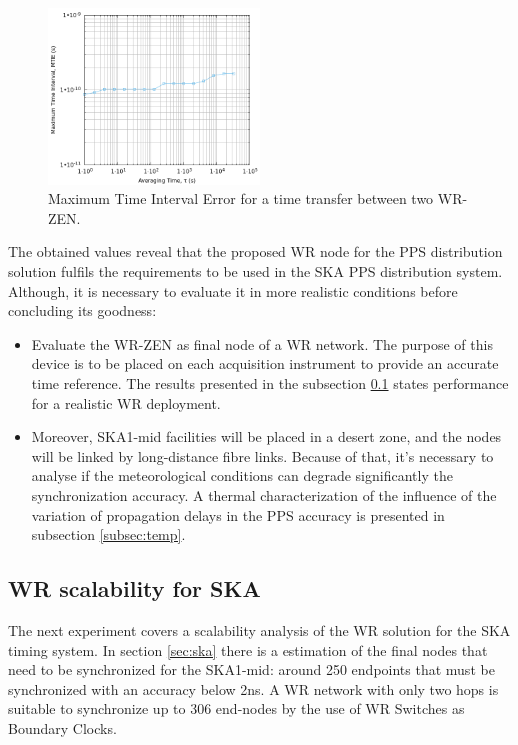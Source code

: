 \begin{figure}
		\centering
		\includegraphics[width=0.5\textwidth]{img/MTIE_exp1}
		\caption[MTIE plot for the WR-ZEN]{Maximum Time Interval Error for a 
		time transfer between two WR-ZEN.}
		\label{fig:mtie_exp1}

\end{figure}

The obtained values reveal that the proposed WR node for the PPS distribution 
solution fulfils the requirements to be used in the SKA PPS distribution 
system. Although, it is necessary to evaluate it in more realistic conditions 
before concluding its goodness:

\begin{itemize}
	\item Evaluate the WR-ZEN as final node of a WR network. The purpose of 
	this device is to be placed on each acquisition instrument to provide an 
	accurate time reference. The results presented in the subsection 
	\ref{subsec: net_exp} states performance for a realistic WR deployment.
	
	\item Moreover, SKA1-mid facilities will be placed in a desert zone, and 
	the nodes will be linked by long-distance fibre links. Because of that, 
	it's 
	necessary to analyse if the meteorological conditions can degrade 
	significantly the synchronization accuracy. A thermal characterization of 
	the influence of the variation of propagation delays in the PPS accuracy is 
	presented in subsection \ref{subsec:temp}.
\end{itemize}   

\subsection{WR scalability for SKA} %
\label{subsec: net_exp}

The next experiment covers a scalability analysis of the WR solution for the 
SKA timing system. In section \ref{sec:ska} there is a estimation of the final 
nodes that need to be synchronized for the SKA1-mid: around 250 endpoints that 
must be synchronized with an accuracy below 2ns. A WR network with only two 
hops is suitable to synchronize up to 306 end-nodes by the use of WR Switches as 
Boundary Clocks.

